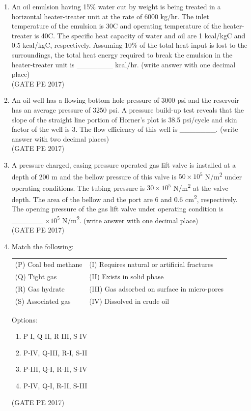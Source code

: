 \documentclass[journal,12pt,onecolumn]{IEEEtran}
\theoremstyle{remark}
\begin{document}
\begin{enumerate}[start=1, label={Q\arabic*.}]
\item An oil emulsion having 15\% water cut by weight is being treated in a horizontal heater-treater unit at the rate of 6000 kg/hr. The inlet temperature of the emulsion is 30\textdegree C and operating temperature of the heater-treater is 40\textdegree C. The specific heat capacity of water and oil are 1 kcal/kg\textdegree C and 0.5 kcal/kg\textdegree C, respectively. Assuming 10\% of the total heat input is lost to the surroundings, the total heat energy required to break the emulsion in the heater-treater unit is \_\_\_\_\_\_\_ kcal/hr. (write answer with one decimal place)\\

\hfill{(GATE PE 2017)}

\item An oil well has a flowing bottom hole pressure of 3000 psi and the reservoir has an average pressure of 3250 psi. A pressure build-up test reveals that the slope of the straight line portion of Horner’s plot is 38.5 psi/cycle and skin factor of the well is 3. The flow efficiency of this well is \_\_\_\_\_\_\_. (write answer with two decimal places)\\

\hfill{(GATE PE 2017)}


\item A pressure charged, casing pressure operated gas lift valve is installed at a depth of 200 m and the bellow pressure of this valve is $50 \times 10^5$ N/m\textsuperscript{2} under operating conditions. The tubing pressure is $30 \times 10^5$ N/m\textsuperscript{2} at the valve depth. The area of the bellow and the port are 6 and 0.6 cm\textsuperscript{2}, respectively. The opening pressure of the gas lift valve under operating condition is \_\_\_\_\_\_ $\times 10^5$ N/m\textsuperscript{2}. (write answer with one decimal place)\\

\hfill{(GATE PE 2017)}

\item Match the following:\\

\begin{tabular}{ll}
(P) Coal bed methane & (I) Requires natural or artificial fractures \\
(Q) Tight gas        & (II) Exists in solid phase \\
(R) Gas hydrate      & (III) Gas adsorbed on surface in micro-pores \\
(S) Associated gas   & (IV) Dissolved in crude oil \\
\end{tabular}
Options:
\begin{enumerate}
\item P-I, Q-II, R-III, S-IV  
\item P-IV, Q-III, R-I, S-II  
\item P-III, Q-I, R-II, S-IV  
\item P-IV, Q-I, R-II, S-III  
\end{enumerate}
\hfill{(GATE PE 2017)}


\end{enumerate}
\end{document}
